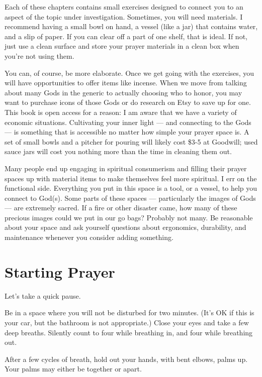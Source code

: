\documentclass[
]{book}
\begin{document}
Each of these chapters contains small exercises designed to connect you to an aspect of the topic under investigation. Sometimes, you will need materials. I recommend having a small bowl on hand, a vessel (like a jar) that contains water, and a slip of paper. If you can clear off a part of one shelf, that is ideal. If not, just use a clean surface and store your prayer materials in a clean box when you're not using them.

You can, of course, be more elaborate. Once we get going with the exercises, you will have opportunities to offer items like incense. When we move from talking about many Gods in the generic to actually choosing who to honor, you may want to purchase icons of those Gods or do research on Etsy to save up for one. This book is open access for a reason: I am aware that we have a variety of economic situations. Cultivating your inner light --- and connecting to the Gods --- is something that is accessible no matter how simple your prayer space is. A set of small bowls and a pitcher for pouring will likely cost \$3-5 at Goodwill; used sauce jars will cost you nothing more than the time in cleaning them out.

Many people end up engaging in spiritual consumerism and filling their prayer spaces up with material items to make themselves feel more spiritual. I err on the functional side. Everything you put in this space is a tool, or a vessel, to help you connect to God(s). Some parts of these spaces --- particularly the images of Gods --- are extremely sacred. If a fire or other disaster came, how many of these precious images could we put in our go bags? Probably not many. Be reasonable about your space and ask yourself questions about ergonomics, durability, and maintenance whenever you consider adding something.

\hypertarget{starting-prayer}{%
\section{Starting Prayer}\label{starting-prayer}}

Let's take a quick pause.

Be in a space where you will not be disturbed for two minutes. (It's OK if this is your car, but the bathroom is not appropriate.) Close your eyes and take a few deep breaths. Silently count to four while breathing in, and four while breathing out.

After a few cycles of breath, hold out your hands, with bent elbows, palms up. Your palms may either be together or apart.
\end{document}
